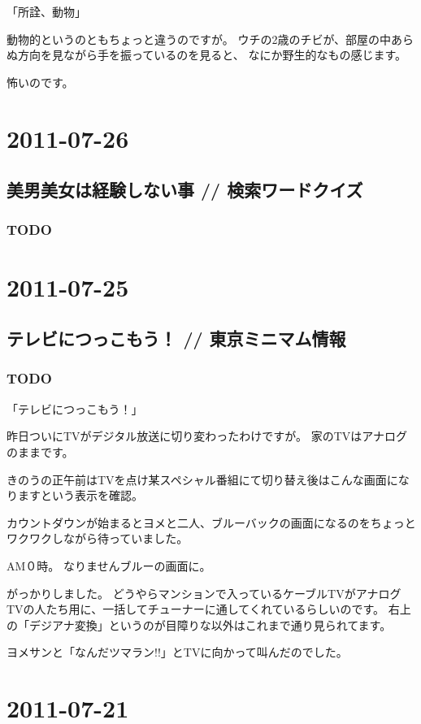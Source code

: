 \documentclass[11pt]{article}
\begin{document}
「所詮、動物」

動物的というのともちょっと違うのですが。
ウチの2歳のチビが、部屋の中あらぬ方向を見ながら手を振っているのを見ると、
なにか野生的なもの感じます。

怖いのです。
\section{2011-07-26}
\label{sec-90}
\subsection{美男美女は経験しない事 // 検索ワードクイズ}
\label{sec-90_1}
\subsubsection{\textbf{TODO}}
\label{sec-90_1_1}
\section{2011-07-25}
\label{sec-91}
\subsection{テレビにつっこもう！ // 東京ミニマム情報}
\label{sec-91_1}
\subsubsection{\textbf{TODO}}
\label{sec-91_1_1}

「テレビにつっこもう！」

昨日ついにTVがデジタル放送に切り変わったわけですが。
家のTVはアナログのままです。

きのうの正午前はTVを点け某スペシャル番組にて切り替え後はこんな画面になりますという表示を確認。

カウントダウンが始まるとヨメと二人、ブルーバックの画面になるのをちょっとワクワクしながら待っていました。

AM０時。
なりませんブルーの画面に。

がっかりしました。
どうやらマンションで入っているケーブルTVがアナログTVの人たち用に、一括してチューナーに通してくれているらしいのです。
右上の「デジアナ変換」というのが目障りな以外はこれまで通り見られてます。

ヨメサンと「なんだツマラン!!」とTVに向かって叫んだのでした。
\section{2011-07-21}
\label{sec-92}
\end{document}

